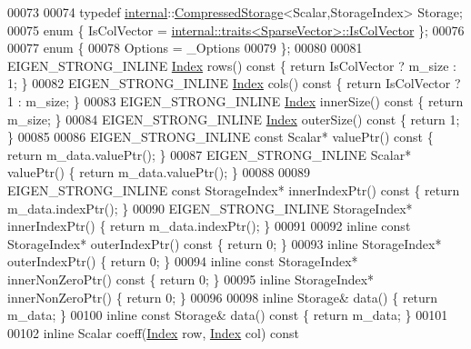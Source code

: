 \begin{DoxyCode}
00073     
00074     typedef \hyperlink{namespaceinternal}{internal}::\hyperlink{class_eigen_1_1internal_1_1_compressed_storage}{CompressedStorage}<Scalar,StorageIndex> Storage;
00075     enum \{ IsColVector = \hyperlink{struct_eigen_1_1internal_1_1traits}{internal::traits<SparseVector>::IsColVector}
       \};
00076     
00077     \textcolor{keyword}{enum} \{
00078       Options = \_Options
00079     \};
00080     
00081     EIGEN\_STRONG\_INLINE \hyperlink{namespace_eigen_a62e77e0933482dafde8fe197d9a2cfde}{Index} rows()\textcolor{keyword}{ const }\{ \textcolor{keywordflow}{return} IsColVector ? m\_size : 1; \}
00082     EIGEN\_STRONG\_INLINE \hyperlink{namespace_eigen_a62e77e0933482dafde8fe197d9a2cfde}{Index} cols()\textcolor{keyword}{ const }\{ \textcolor{keywordflow}{return} IsColVector ? 1 : m\_size; \}
00083     EIGEN\_STRONG\_INLINE \hyperlink{namespace_eigen_a62e77e0933482dafde8fe197d9a2cfde}{Index} innerSize()\textcolor{keyword}{ const }\{ \textcolor{keywordflow}{return} m\_size; \}
00084     EIGEN\_STRONG\_INLINE \hyperlink{namespace_eigen_a62e77e0933482dafde8fe197d9a2cfde}{Index} outerSize()\textcolor{keyword}{ const }\{ \textcolor{keywordflow}{return} 1; \}
00085 
00086     EIGEN\_STRONG\_INLINE \textcolor{keyword}{const} Scalar* valuePtr()\textcolor{keyword}{ const }\{ \textcolor{keywordflow}{return} m\_data.valuePtr(); \}
00087     EIGEN\_STRONG\_INLINE Scalar* valuePtr() \{ \textcolor{keywordflow}{return} m\_data.valuePtr(); \}
00088 
00089     EIGEN\_STRONG\_INLINE \textcolor{keyword}{const} StorageIndex* innerIndexPtr()\textcolor{keyword}{ const }\{ \textcolor{keywordflow}{return} m\_data.indexPtr(); \}
00090     EIGEN\_STRONG\_INLINE StorageIndex* innerIndexPtr() \{ \textcolor{keywordflow}{return} m\_data.indexPtr(); \}
00091 
00092     \textcolor{keyword}{inline} \textcolor{keyword}{const} StorageIndex* outerIndexPtr()\textcolor{keyword}{ const }\{ \textcolor{keywordflow}{return} 0; \}
00093     \textcolor{keyword}{inline} StorageIndex* outerIndexPtr() \{ \textcolor{keywordflow}{return} 0; \}
00094     \textcolor{keyword}{inline} \textcolor{keyword}{const} StorageIndex* innerNonZeroPtr()\textcolor{keyword}{ const }\{ \textcolor{keywordflow}{return} 0; \}
00095     \textcolor{keyword}{inline} StorageIndex* innerNonZeroPtr() \{ \textcolor{keywordflow}{return} 0; \}
00096     
00098     \textcolor{keyword}{inline} Storage& data() \{ \textcolor{keywordflow}{return} m\_data; \}
00100     \textcolor{keyword}{inline} \textcolor{keyword}{const} Storage& data()\textcolor{keyword}{ const }\{ \textcolor{keywordflow}{return} m\_data; \}
00101 
00102     \textcolor{keyword}{inline} Scalar coeff(\hyperlink{namespace_eigen_a62e77e0933482dafde8fe197d9a2cfde}{Index} row, \hyperlink{namespace_eigen_a62e77e0933482dafde8fe197d9a2cfde}{Index} col)\textcolor{keyword}{ const}

\end{DoxyCode}
